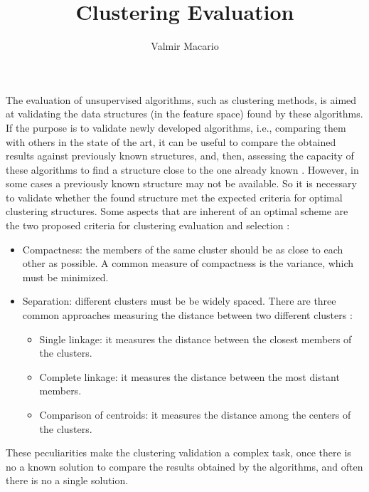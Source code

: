 \title{Clustering Evaluation}
\label{chp:evaluation-unsupervised-learning}
\author{Valmir Macario}
\institute{}
\maketitle
 
The evaluation of unsupervised algorithms, such as clustering methods, is aimed at validating the data structures (in the feature space) found by these algorithms. If the purpose is to validate newly developed algorithms, i.e., comparing them with others in the state of the art, it can be useful to compare the obtained results against previously known structures, and, then, assessing the capacity of these algorithms to find a structure close to the one already known \cite{carvalho2011inteligencia}. However, in some cases a previously known structure may not be available. So it is necessary to validate whether the found structure met the expected criteria for optimal clustering structures. Some aspects that are inherent of an optimal scheme are the two proposed criteria for clustering evaluation and selection \cite{Berry1996}:
\begin{itemize}
\item Compactness: the members of the same cluster should be as close to each other as possible. A common measure of compactness is the variance, which must be minimized.

\item Separation: different clusters must be be widely spaced. There are three common approaches measuring the distance between two different clusters \cite{halkidi2001clustering}:
\begin{itemize}
    
\item Single linkage: it measures the distance between the closest members of the clusters.
\item Complete linkage: it measures the distance between the most distant members.
\item Comparison of centroids: it measures the distance among the centers of the clusters.
\end{itemize}
\end{itemize}

These peculiarities make the clustering validation a complex task, once there is no a known solution to compare the results obtained by the algorithms, and often there is no a single solution. 

